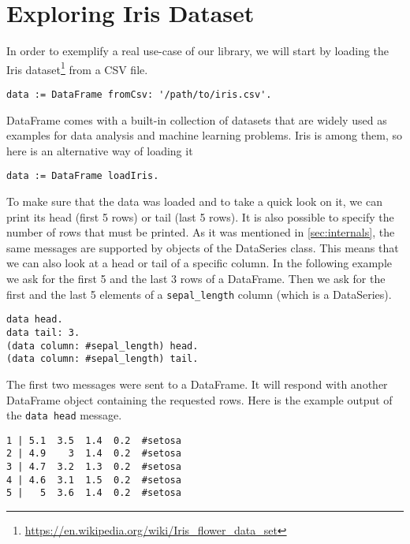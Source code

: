 \documentclass[sigplan]{acmart}
\begin{document}
\section{Exploring Iris Dataset}
\label{sec:iris-eda}
%
%

In order to exemplify a real use-case of our library, we will start by loading the Iris dataset\footnote{\url{https://en.wikipedia.org/wiki/Iris_flower_data_set}} from a CSV file.

\begin{lstlisting}[basicstyle=\small,language=Smalltalk]
data := DataFrame fromCsv: '/path/to/iris.csv'.
\end{lstlisting}

DataFrame comes with a built-in collection of datasets that are widely used as examples for data analysis and machine learning problems. Iris is among them, so here is an alternative way of loading it

\begin{lstlisting}[basicstyle=\small,language=Smalltalk]
data := DataFrame loadIris.
\end{lstlisting}

To make sure that the data was loaded and to take a quick look on it, we can print its head (first 5 rows) or tail (last 5 rows). It is also possible to specify the number of rows that must be printed. As it was mentioned in \ref{sec:internals}, the same messages are supported by objects of the DataSeries class. This means that we can also look at a head or tail of a specific column. In the following example we ask for the first 5 and the last 3 rows of a DataFrame. Then we ask for the first and the last 5 elements of a \texttt{sepal\_length} column (which is a DataSeries).

\begin{lstlisting}[basicstyle=\small,language=Smalltalk]
data head.
data tail: 3.
(data column: #sepal_length) head.
(data column: #sepal_length) tail.
\end{lstlisting}

The first two messages were sent to a DataFrame. It will respond with another DataFrame object containing the requested rows. Here is the example output of the \texttt{data head} message.

\begin{lstlisting}[basicstyle=\small, belowskip=1em, aboveskip=1em,]
1 | 5.1  3.5  1.4  0.2  #setosa
2 | 4.9    3  1.4  0.2  #setosa
3 | 4.7  3.2  1.3  0.2  #setosa
4 | 4.6  3.1  1.5  0.2  #setosa
5 |   5  3.6  1.4  0.2  #setosa
\end{lstlisting}
\end{document}

